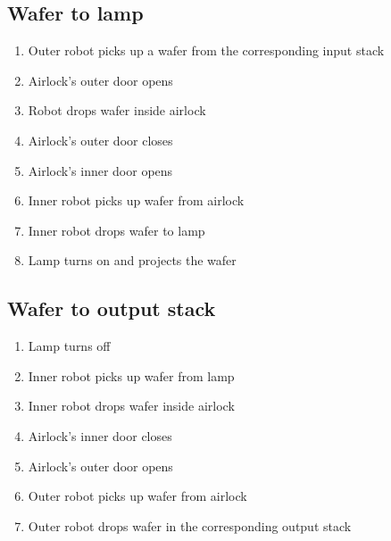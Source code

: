 \subsection{Wafer to lamp}
\begin{enumerate}
	\item Outer robot picks up a wafer from the corresponding input stack
	\item Airlock's outer door opens
	\item Robot drops wafer inside airlock
	\item Airlock's outer door closes
	\item Airlock's inner door opens
	\item Inner robot picks up wafer from airlock
	\item Inner robot drops wafer to lamp
	\item Lamp turns on and projects the wafer
\end{enumerate}

\subsection{Wafer to output stack}
\begin{enumerate}
	\item Lamp turns off
	\item Inner robot picks up wafer from lamp
	\item Inner robot drops wafer inside airlock
	\item Airlock's inner door closes
	\item Airlock's outer door opens
	\item Outer robot picks up wafer from airlock
	\item Outer robot drops wafer in the corresponding output stack
\end{enumerate}
